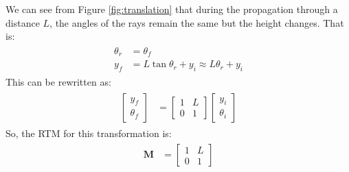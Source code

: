 \documentclass[12pt]{article}
\begin{document}
We can see from Figure \ref{fig:translation} that during the propagation through a distance \(L\), the angles of the rays remain the same but the height changes. That is:
\begin{align}
    \begin{split}
        \theta_r & = \theta_f \\
        y_f & = L\tan\theta_r + y_i \approx L\theta_r + y_i
    \end{split}
\end{align}
This can be rewritten as:
\begin{align}
    \begin{split}
        \begin{bmatrix}
            y_f \\
            \theta_f
        \end{bmatrix} & = \begin{bmatrix}
            1 & L \\
            0 & 1
        \end{bmatrix} \begin{bmatrix}
            y_i \\
            \theta_i
        \end{bmatrix}
    \end{split}
\end{align}
So, the RTM for this transformation is:
\begin{align}
    \label{eq:translation}
    \begin{split}
        \mathbf{M} & = \begin{bmatrix}
            1 & L \\
            0 & 1
        \end{bmatrix}
    \end{split}
\end{align}
\end{document}
